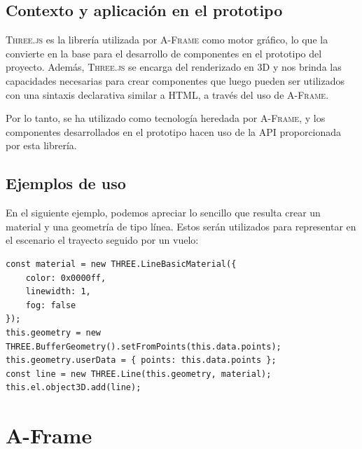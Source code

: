 \documentclass[a4paper, 11pt]{book}
\begin{document}
\subsection{Contexto y aplicación en el prototipo}
\textsc{Three.js} es la librería utilizada por \textsc{A-Frame} como motor gráfico, lo que la convierte en la base para el desarrollo de componentes en el prototipo del proyecto. Además, \textsc{Three.js} se encarga del renderizado en \textsc{3D} y nos brinda las capacidades necesarias para crear componentes que luego pueden ser utilizados con una sintaxis declarativa similar a \textsc{HTML}, a través del uso de \textsc{A-Frame}. 

Por lo tanto, se ha utilizado como tecnología heredada por \textsc{A-Frame}, y los componentes desarrollados en el prototipo hacen uso de la \textsc{API} proporcionada por esta librería.
\subsection{Ejemplos de uso}
En el siguiente ejemplo, podemos apreciar lo sencillo que resulta crear un material y una geometría de tipo línea. Estos serán utilizados para representar en el escenario el trayecto seguido por un vuelo:
\begin{verbatim}
const material = new THREE.LineBasicMaterial({
    color: 0x0000ff,
    linewidth: 1,
    fog: false
});
this.geometry = new THREE.BufferGeometry().setFromPoints(this.data.points);
this.geometry.userData = { points: this.data.points };
const line = new THREE.Line(this.geometry, material);
this.el.object3D.add(line);
\end{verbatim}
\section{A-Frame}
\label{sec:aframe}
\end{document}
